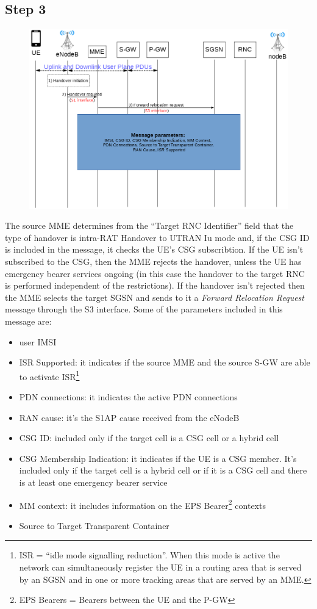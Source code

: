 \subsection*{Step 3}
\begin{figure}[htb]
	\centering
	\includegraphics[width=0.9\linewidth]{img/preparation-3.png}
	\label{fig:3}
\end{figure}
The source MME determines from the ``Target RNC Identifier'' field that
the type of handover is intra-RAT Handover to UTRAN Iu mode and, if the CSG ID
is included in the message, it checks the UE's CSG subscribtion. If the UE isn't
subscribed to the CSG, then the MME rejects the handover, unless the UE has
emergency bearer services ongoing (in this case the handover to the target RNC is
performed independent of the restrictions).	If the handover isn't rejected then
the MME selects the target SGSN and sends to it	a \emph{Forward Relocation Request}
message through the S3 interface. Some of the parameters included in this message are:
\begin{itemize}
	\item user IMSI
	\item ISR Supported: it indicates if the source MME and the source S-GW are
	able to activate ISR\footnote{ISR = ``idle mode signalling reduction''. When
	this mode is active the network can simultaneously register the UE in a
	routing area that is served by an SGSN and in one or more tracking areas
	that are served by an MME.}
	\item PDN connections: it indicates the active PDN connections
	\item RAN cause: it's the S1AP cause received from the eNodeB
	\item CSG ID: included only if the target cell is a CSG cell or a hybrid cell
	\item CSG Membership Indication: it indicates if the UE is a CSG member. It's
	included only if the target cell is a hybrid cell or if it is a CSG cell and
	there is at least one emergency bearer service
	\item MM context: it includes information on the EPS Bearer\footnote{EPS Bearers
	= Bearers between the UE and the P-GW} contexts
	\item Source to Target Transparent Container
\end{itemize}
